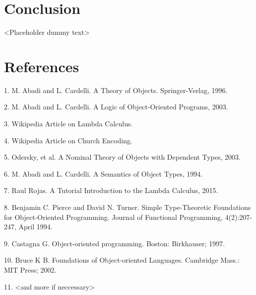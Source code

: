 \documentclass[10pt,twocolumn]{article}
\begin{document}
\section{Conclusion}

<Placeholder dummy text>

\section{References}

1. M. Abadi and L. Cardelli. A Theory of Objects. Springer-Verlag, 1996. 

2. M. Abadi and L. Cardelli. A Logic of Object-Oriented Programs, 2003. 

3. Wikipedia Article on Lambda Calculus. 

4. Wikipedia Article on Church Encoding. 

5. Odersky, et al. A Nominal Theory of Objects with Dependent Types, 2003. 

6. M. Abadi and L. Cardelli. A Semantics of Object Types, 1994. 

7. Raul Rojas. A Tutorial Introduction to the Lambda Calculus, 2015. 

8. Benjamin C. Pierce and David N. Turner. Simple Type-Theoretic Foundations for Object-Oriented Programming. Journal of Functional Programming, 4(2):207-247, April 1994. 

9. Castagna G. Object-oriented programming. Boston: Birkhauser; 1997.  

10. Bruce K B. Foundations of Object-oriented Languages. Cambridge  Mass.: MIT Press; 2002.  

11. <and more if neccessary>




\end{document}
